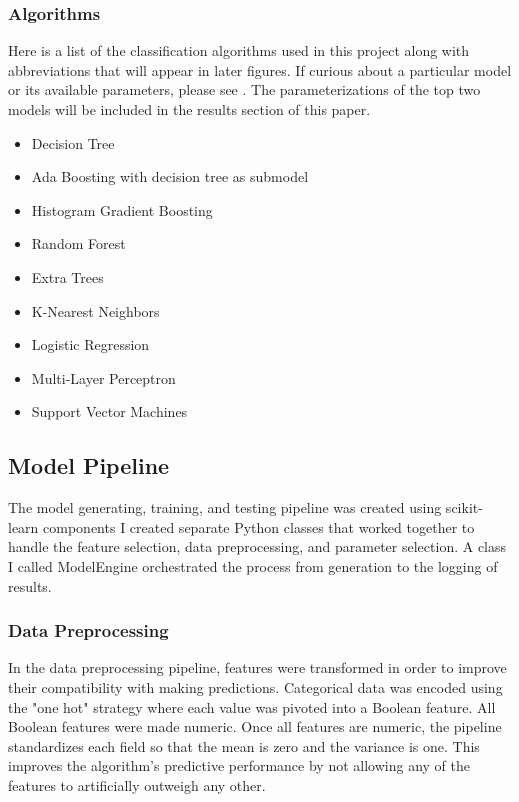 \documentclass{article}
\begin{document}
            \subsubsection{Algorithms}
                Here is a list of the classification algorithms used in this project along with abbreviations that will appear in later figures. 
                If curious about a particular model or its available parameters, please see \cite{sklearn}.
                The parameterizations of the top two models will be included in the results section of this paper.
                \begin{itemize}
                    \item Decision Tree
                    \item Ada Boosting with decision tree as submodel
                    \item Histogram Gradient Boosting
                    \item Random Forest
                    \item Extra Trees
                    \item K-Nearest Neighbors
                    \item Logistic Regression
                    \item Multi-Layer Perceptron
                    \item Support Vector Machines
                \end{itemize}

        \subsection{Model Pipeline}
            The model generating, training, and testing pipeline was created using scikit-learn components \cite{sklearn} 
            I created separate Python classes that worked together to handle the feature selection, data preprocessing, and parameter selection.
            A class I called ModelEngine orchestrated the process from generation to the logging of results.

            \subsubsection{Data Preprocessing}
                In the data preprocessing pipeline, features were transformed in order to improve their compatibility with making predictions.
                Categorical data was encoded using the "one hot" strategy where each value was pivoted into a Boolean feature.    
                All Boolean features were made numeric.
                Once all features are numeric, the pipeline standardizes each field so that the mean is zero and the variance is one.
                This improves the algorithm's predictive performance by not allowing any of the features to artificially outweigh any other.
                
\end{document}
